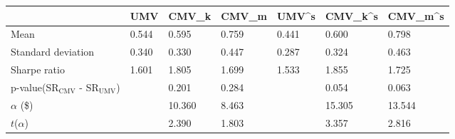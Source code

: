 \begin{tabular}{lllllll}
\toprule
 & UMV & CMV_k & CMV_m & UMV^s & CMV_k^s & CMV_m^s \\
\midrule
Mean & 0.544 & 0.595 & 0.759 & 0.441 & 0.600 & 0.798 \\
Standard deviation & 0.340 & 0.330 & 0.447 & 0.287 & 0.324 & 0.463 \\
Sharpe ratio & 1.601 & 1.805 & 1.699 & 1.533 & 1.855 & 1.725 \\
p-value(SR$_{\text{CMV}}$ - SR$_{\text{UMV}}$) &  & 0.201 & 0.284 &  & 0.054 & 0.063 \\
$\alpha$ (\$) &  & 10.360 & 8.463 &  & 15.305 & 13.544 \\
$t$($\alpha$) &  & 2.390 & 1.803 &  & 3.357 & 2.816 \\
\bottomrule
\end{tabular}
